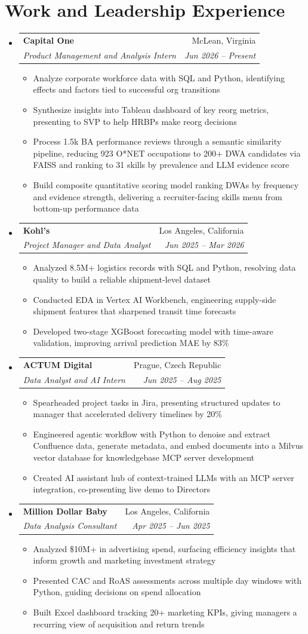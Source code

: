 \documentclass[letterpaper,11pt]{article}
\makeatletter
\newcommand{\resumeItem}[1]{
  \item\small{#1}
}
\newcommand{\resumeSubheading}[4]{
  \vspace{-2pt}\item
    \begin{tabular*}{\textwidth}[t]{l@{\extracolsep{\fill}}r}
      \textbf{#1} & #2 \\
      \textit{\small#3} & \textit{\small #4} \\
    \end{tabular*}\vspace{-7pt}
}
\newcommand{\resumeSubHeadingListStart}{\begin{itemize}[leftmargin=0in, label={}]}
\newcommand{\resumeSubHeadingListEnd}{\end{itemize}}
\newcommand{\resumeItemListStart}{\begin{itemize}[itemsep= 1.5pt, parsep=0pt]}
\newcommand{\resumeItemListEnd}{\end{itemize}\vspace{-5pt}}
\makeatother
\begin{document}
\section{Work and Leadership Experience}
  \resumeSubHeadingListStart
    \resumeSubheading
      {Capital One}{McLean, Virginia}
      {Product Management and Analysis Intern}{Jun 2026 -- Present}
      \resumeItemListStart
        \resumeItem{Analyze corporate workforce data with SQL and Python, identifying effects and factors tied to successful org transitions}
        \resumeItem{Synthesize insights into Tableau dashboard of key reorg metrics, presenting to SVP to help HRBPs make reorg decisions}
        \resumeItem{Process 1.5k BA performance reviews through a semantic similarity pipeline, reducing 923 O*NET occupations to 200+ DWA candidates via FAISS and ranking to 31 skills by prevalence and LLM evidence score}
        \resumeItem{Build composite quantitative scoring model ranking DWAs by frequency and evidence strength, delivering a recruiter-facing skills menu from bottom-up performance data}
      \resumeItemListEnd
    \resumeSubheading
      {Kohl's}{Los Angeles, California}
      {Project Manager and Data Analyst}{Jun 2025 -- Mar 2026}
      \resumeItemListStart
        \resumeItem{Analyzed 8.5M+ logistics records with SQL and Python, resolving data quality to build a reliable shipment-level dataset}
        \resumeItem{Conducted EDA in Vertex AI Workbench, engineering supply-side shipment features that sharpened transit time forecasts}
        \resumeItem{Developed two-stage XGBoost forecasting model with time-aware validation, improving arrival prediction MAE by 83\%}
      \resumeItemListEnd
    \resumeSubheading
      {ACTUM Digital}{Prague, Czech Republic}
      {Data Analyst and AI Intern}{Jun 2025 -- Aug 2025}
      \resumeItemListStart
        \resumeItem{Spearheaded project tasks in Jira, presenting structured updates to manager that accelerated delivery timelines by 20\%}
        \resumeItem{Engineered agentic workflow with Python to denoise and extract Confluence data, generate metadata, and embed documents into a Milvus vector database for knowledgebase MCP server development}
        \resumeItem{Created AI assistant hub of context-trained LLMs with an MCP server integration, co-presenting live demo to Directors}
      \resumeItemListEnd
    \resumeSubheading
      {Million Dollar Baby}{Los Angeles, California}
      {Data Analysis Consultant}{Apr 2025 -- Jun 2025}
      \resumeItemListStart
        \resumeItem{Analyzed \$10M+ in advertising spend, surfacing efficiency insights that inform growth and marketing investment strategy}
        \resumeItem{Presented CAC and RoAS assessments across multiple day windows with Python, guiding decisions on spend allocation}
        \resumeItem{Built Excel dashboard tracking 20+ marketing KPIs, giving managers a recurring view of acquisition and return trends}
      \resumeItemListEnd
  \resumeSubHeadingListEnd
\end{document}
